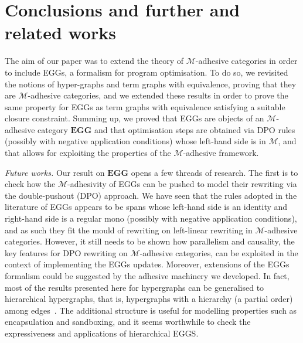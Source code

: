 \documentclass[a4paper,UKenglish,cleveref,pdftex,amsthm,thm-restate,numberwithinsect]{cas-sc}
\theoremstyle{plain}
\theoremstyle{definition}
\newcommand{\eg}[0]{\mathbf{EGG}}
\begin{document}
\section{Conclusions and further and related works}
\label{conclusioni}
The aim of our paper was to extend the theory of $\mathcal{M}$-adhesive categories in order to include EGGs, 
a formalism for program optimisation. 
%
To do so, we revisited the notions of hyper-graphs and term graphs with equivalence, 
proving that they are $\mathcal{M}$-adhesive categories, and we extended these results in order to
prove the same property for EGGs as term graphs with equivalence satisfying a suitable closure constraint.
Summing up, we proved that EGGs are objects of an $\mathcal{M}$-adhesive category $\eg$ 
and that optimisation steps are obtained via DPO rules (possibly with negative application conditions) whose 
left-hand side is in $\mathcal{M}$,
and that allows for exploiting the properties 
of the $\mathcal{M}$-adhesive framework.

\emph{Future works.}
Our result on $\eg$ opens a few threads of research. The first is to check how the $\mathcal{M}$-adhesivity 
of EGGs can be pushed to model their rewriting via the double-pushout (DPO) approach. We have seen that 
the rules adopted in the literature of EGGs appears to be spans whose left-hand side is an identity and 
right-hand side is a regular mono (possibly with negative application 
conditions), and as such they fit the mould of rewriting on left-linear rewriting in $\mathcal{M}$-adhesive categories. 
%
However, it still needs to be shown how parallelism and causality, the key features for DPO rewriting
on $\mathcal{M}$-adhesive categories, can be exploited in the context of implementing the 
EGGs updates. 
Moreover, extensions of the EGGs formalism could be suggested by the adhesive 
machinery we developed.
In fact, most of the results
presented here for hypergraphs can be generalised to hierarchical hypergraphs, that is, 
hypergraphs with a hierarchy (a partial order) among 
edges~\cite{ghicaZan,CastelnovoGM24}.
The additional structure is useful for modelling properties such as encapsulation and sandboxing,
and it seems worthwhile to check the expressiveness and applications of hierarchical EGGS.
\end{document}
